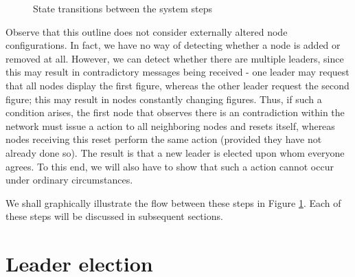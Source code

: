 \begin{figure}
  \centering
  \caption{\label{fig:statetrans} State transitions between the system steps}
\end{figure}

Observe that this outline does not consider externally altered node configurations. In fact, we have no way of detecting whether a node is added or removed at all. However, we can detect whether there are multiple leaders, since this may result in contradictory messages being received - one leader may request that all nodes display the first figure, whereas the other leader request the second figure; this may result in nodes constantly changing figures. Thus, if such a condition arises, the first node that observes there is an contradiction within the network must issue a  action to all neighboring nodes and resets itself, whereas nodes receiving this reset perform the same action (provided they have not already done so). The result is that a new leader is elected upon whom everyone agrees. To this end, we will also have to show that such a  action cannot occur under ordinary circumstances.

We shall graphically illustrate the flow between these steps in Figure \ref{fig:statetrans}. Each of these steps will be discussed in subsequent sections.


\section{Leader election}
\label{algo:leaderelection}

